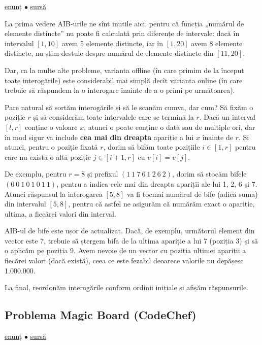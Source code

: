 \documentclass[../main.tex]{subfiles}
\begin{document}
\href{https://www.spoj.com/problems/DQUERY/}{enunț}
$\bullet$
\hyperref[code:dquery-fenwick]{sursă}

La prima vedere AIB-urile ne sînt inutile aici, pentru că funcția „numărul de elemente distincte” nu poate fi calculată prin diferențe de intervale: dacă în intervalul $[1, 10]$ avem 5 elemente distincte, iar în $[1, 20]$ avem 8 elemente distincte, nu știm destule despre numărul de elemente distincte din $[11, 20]$.

Dar, ca la multe alte probleme, varianta offline (în care primim de la început toate interogările) este considerabil mai simplă decît varianta online (în care trebuie să răspundem la o interogare înainte de a o primi pe următoarea).

Pare natural să sortăm interogările și să le scanăm cumva, dar cum? Să fixăm o poziție $r$ și să considerăm toate intervalele care se termină la $r$. Dacă un interval $[l, r]$ conține o valoare $x$, atunci o poate conține o dată sau de multiple ori, dar în mod sigur va include \textbf{cea mai din dreapta} apariție a lui $x$ înainte de $r$. Și atunci, pentru o poziție fixată $r$, dorim să bifăm toate pozițiile $i \in [1, r]$ pentru care nu există o altă poziție $j \in [i+1, r]$ cu $v[i] = v[j]$.

De exemplu, pentru $r = 8$ și prefixul $(1\ 1\ 7\ 6\ 1\ 2\ 6\ 2)$, dorim să stocăm bifele $(0\ 0\ 1\ 0\ 1\ 0\ 1\ 1)$, pentru a indica cele mai din dreapta apariții ale lui 1, 2, 6 și 7. Atunci răspunsul la interogarea $[5, 8]$ va fi tocmai numărul de bife (adică suma) din intervalul $[5, 8]$, pentru că astfel ne asigurăm că numărăm exact o apariție, ultima, a fiecărei valori din interval.

AIB-ul de bife este ușor de actualizat. Dacă, de exemplu, următorul element din vector este 7, trebuie să ștergem bifa de la ultima apariție a lui 7 (poziția 3) și să o aplicăm pe poziția 9. Avem nevoie de un vector cu poziția ultimei apariții a fiecărei valori (dacă există), ceea ce este fezabil deoarece valorile nu depășesc 1.000.000.

La final, reordonăm interogările conform ordinii inițiale și afișăm răspunsurile.

\subsection{Problema Magic Board (CodeChef)}
\label{problem:mboard}

\href{https://www.codechef.com/problems/MBOARD}{enunț}
$\bullet$
\hyperref[code:mboard]{sursă}
\end{document}
